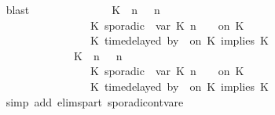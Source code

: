 \begin{isabellebody}
\ \ \ \ \ \ \ \ \ \ \ \ \isamarkupfalse%
\ blast\isanewline
\ \ \ \ \ \ \ \ \ \ \isamarkupfalse%
\ \isamarkupfalse%
\ {\isacartoucheopen}{\isacharparenleft}\ {\isacharparenleft}{\isacharparenleft}K\ {\isasymUp}\ n{\isacharparenright}\ {\isacharhash}\ {\isasymGamma}{\isacharparenright}{\isacharcomma}\ n\isanewline
\ \ \ \ \ \ \ \ \ \ \ \ \ \ \ \ \ \ \ \ \ \ \ \ \ \ \ \ {\isasymturnstile}\ {\isacharparenleft}K\ sporadic{\isasymsharp}\ {\isasymlparr}\ {\isasymtau}\isactrlsub v\isactrlsub a\isactrlsub r\ {\isacharparenleft}K\ n{\isacharparenright}\ {\isasymoplus}\ {\isasymdelta}{\isasymtau}\ {\isasymrparr}\ on\ K\ {\isacharhash}\ {\isasymPsi}\isanewline
\ \ \ \ \ \ \ \ \ \ \ \ \ \ \ \ \ \ \ \ \ \ \ \ \ \ \ \ {\isasymtriangleright}\ {\isacharparenleft}{\isacharparenleft}K\ time{\isacharminus}delayed{\isasymsharp}\ by\ {\isasymdelta}{\isasymtau}\ on\ K\ implies\ K\ {\isacharhash}\ {\isasymPhi}{\isacharparenright}{\isacharparenright}\isanewline
\ \ \ \ \ \ \ \ \ \ \ \ \ \ \ \ \ \ \ \ \ \ \ \ {\isasymhookrightarrow}\ {\isacharparenleft}\ {\isacharparenleft}{\isacharparenleft}K\ {\isasymUp}\ n{\isacharparenright}\ {\isacharhash}\ {\isasymGamma}{\isacharparenright}{\isacharcomma}\ n\isanewline
\ \ \ \ \ \ \ \ \ \ \ \ \ \ \ \ \ \ \ \ \ \ \ \ \ \ \ \ {\isasymturnstile}\ {\isasymPsi}\isanewline
\ \ \ \ \ \ \ \ \ \ \ \ \ \ \ \ \ \ \ \ \ \ \ \ \ \ \ \ {\isasymtriangleright}\ {\isacharparenleft}{\isacharparenleft}K\ sporadic{\isasymsharp}\ {\isasymlparr}\ {\isasymtau}\isactrlsub v\isactrlsub a\isactrlsub r\ {\isacharparenleft}K\ n{\isacharparenright}\ {\isasymoplus}\ {\isasymdelta}{\isasymtau}\ {\isasymrparr}\ on\ K\isanewline
\ \ \ \ \ \ \ \ \ \ \ \ \ \ \ \ \ \ \ \ \ \ \ \ \ \ \ \ {\isacharhash}\ {\isacharparenleft}K\ time{\isacharminus}delayed{\isasymsharp}\ by\ {\isasymdelta}{\isasymtau}\ on\ K\ implies\ K\ {\isacharhash}\ {\isasymPhi}{\isacharparenright}{\isacharparenright}{\isacartoucheclose}\isanewline
\ \ \ \ \ \ \ \ \ \ \ \ \isamarkupfalse%
\ {\isacharparenleft}simp\ add{\isacharcolon}\ elims{\isacharunderscore}part\ sporadic{\isacharunderscore}on{\isacharunderscore}tvar{\isacharunderscore}e{}{\isacharparenright}\isanewline

\end{isabellebody}
